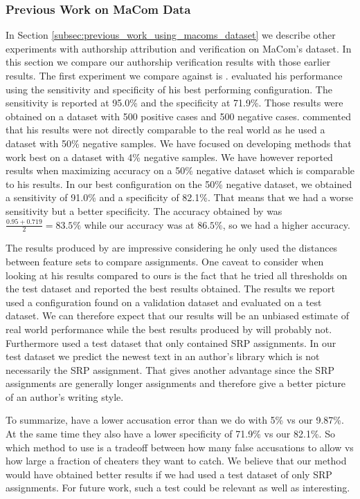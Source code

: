\subsubsection{Previous Work on MaCom Data}

In Section \ref{subsec:previous_work_using_macoms_dataset} we describe other
experiments with authorship attribution and verification on MaCom's dataset.
In this section we compare our authorship verification results with those
earlier results. The first experiment we compare against is \citep{aalykke2016}.
\citet{aalykke2016} evaluated his performance using the sensitivity and
specificity of his best performing configuration. The sensitivity is reported at
95.0\% and the specificity at 71.9\%. Those results were obtained on a dataset
with 500 positive cases and 500 negative cases. \citet{aalykke2016} commented
that his results were not directly comparable to the real world as he used a
dataset with 50\% negative samples. We have focused on developing methods that
work best on a dataset with 4\% negative samples. We have however reported
results when maximizing accuracy on a 50\% negative dataset which is comparable
to his results. In our best configuration on the 50\% negative dataset, we
obtained a sensitivity of 91.0\% and a specificity of 82.1\%. That means that
we had a worse sensitivity but a better specificity. The accuracy obtained by
\citet{aalykke2016} was $\frac{0.95 + 0.719}{2} = 83.5\%$ while our accuracy was
at $86.5\%$, so we had a higher accuracy.

The results produced by \citet{aalykke2016} are impressive considering he only
used the distances between feature sets to compare assignments. One caveat to
consider when looking at his results compared to ours is the fact that he tried
all thresholds on the test dataset and reported the best results obtained.
The results we report used a configuration found on a validation dataset and
evaluated on a test dataset. We can therefore expect that our results will be
an unbiased estimate of real world performance while the best results produced
by \citet{aalykke2016} will probably not. Furthermore \citet{aalykke2016} used
a test dataset that only contained \gls{SRP} assignments. In our test dataset
we predict the newest text in an author's library which is not necessarily the
\gls{SRP} assignment. That gives \citet{aalykke2016} another advantage since
the \gls{SRP} assignments are generally longer assignments and therefore give a
better picture of an author's writing style.

To summarize, \citet{aalykke2016} have a lower accusation error than we do with
5\% vs our 9.87\%. At the same time they also have a lower specificity of 71.9\%
vs our 82.1\%. So which method to use is a tradeoff between how many false
accusations to allow vs how large a fraction of cheaters they want to catch. We
believe that our method would have obtained better results if we had used a test
dataset of only \gls{SRP} assignments. For future work, such a test could be
relevant as well as interesting.

